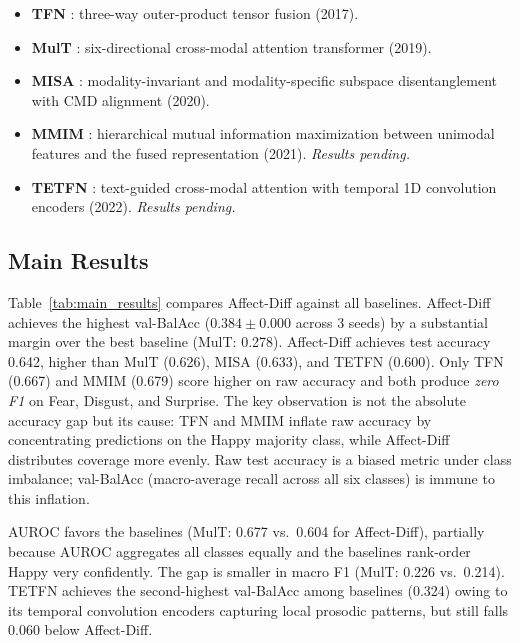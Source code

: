 \documentclass[conference]{IEEEtran}
\begin{document}
\begin{itemize}
    \item \textbf{TFN} \cite{zadeh2017tfn}: three-way outer-product tensor fusion
          (2017).
    \item \textbf{MulT} \cite{tsai2019mult}: six-directional cross-modal
          attention transformer (2019).
    \item \textbf{MISA} \cite{hazarika2020misa}: modality-invariant and
          modality-specific subspace disentanglement with CMD alignment (2020).
    \item \textbf{MMIM} \cite{han2021mmim}: hierarchical mutual information
          maximization between unimodal features and the fused representation
          (2021). \emph{Results pending.}
    \item \textbf{TETFN} \cite{yang2022tetfn}: text-guided cross-modal attention
          with temporal 1D convolution encoders (2022). \emph{Results pending.}
\end{itemize}

\subsection{Main Results}

Table~\ref{tab:main_results} compares Affect-Diff against all baselines.
Affect-Diff achieves the highest val-BalAcc ($0.384 \pm 0.000$ across 3 seeds)
by a substantial margin over the best baseline (MulT: 0.278).
Affect-Diff achieves test accuracy 0.642, higher than MulT (0.626), MISA
(0.633), and TETFN (0.600).  Only TFN (0.667) and MMIM (0.679) score higher on
raw accuracy and both produce \emph{zero F1} on Fear, Disgust, and Surprise.
The key observation is not the absolute accuracy gap but its cause: TFN and MMIM
inflate raw accuracy by concentrating predictions on the Happy majority class,
while Affect-Diff distributes coverage more evenly.  Raw test accuracy is a
biased metric under class imbalance; val-BalAcc (macro-average recall across all
six classes) is immune to this inflation.

AUROC favors the baselines (MulT: 0.677 vs.\ 0.604 for Affect-Diff), partially
because AUROC aggregates all classes equally and the baselines rank-order Happy
very confidently.  The gap is smaller in macro F1 (MulT: 0.226 vs.\ 0.214).
TETFN achieves the second-highest val-BalAcc among baselines (0.324) owing to
its temporal convolution encoders capturing local prosodic patterns, but still
falls 0.060 below Affect-Diff.
\end{document}
